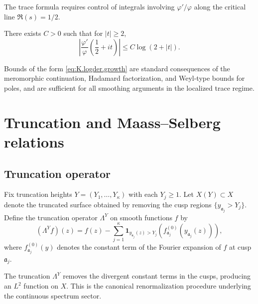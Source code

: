 The trace formula requires control of integrals involving $\varphi'/\varphi$ along the critical line $\Re(s)=1/2$.

\begin{assumption}
\label{ass:K.scattering.growth}
There exists $C>0$ such that for $|t|\ge 2$,
\begin{equation}\label{eq:K.logder.growth}
\left|\frac{\varphi'}{\varphi}\!\left(\frac12+it\right)\right|
\le
C\log(2+|t|).
\end{equation}
\end{assumption}

\begin{remark}
\label{rem:K.scattering.growth}
Bounds of the form \eqref{eq:K.logder.growth} are standard consequences of the meromorphic continuation,
Hadamard factorization, and Weyl-type bounds for poles, and are sufficient for all smoothing arguments in the
localized trace regime.
\end{remark}

\section{Truncation and Maass--Selberg relations}
\label{sec:K.ms}

\subsection{Truncation operator}
\label{subsec:K.truncation}

Fix truncation heights $Y=(Y_1,\dots,Y_\kappa)$ with each $Y_j\ge 1$.
Let $X(Y)\subset X$ denote the truncated surface obtained by removing the cusp regions
$\{y_{\mathfrak{a}_j}>Y_j\}$.
Define the truncation operator $\Lambda^Y$ on smooth functions $f$ by
\begin{equation}\label{eq:K.truncation.op}
(\Lambda^Y f)(z)
=
f(z)
-
\sum_{j=1}^\kappa
\mathbf{1}_{y_{\mathfrak{a}_j}(z)>Y_j}
\left(
f_{\mathfrak{a}_j}^{(0)}(y_{\mathfrak{a}_j}(z))
\right),
\end{equation}
where $f_{\mathfrak{a}_j}^{(0)}(y)$ denotes the constant term of the Fourier expansion of $f$ at cusp $\mathfrak{a}_j$.

\begin{remark}
\label{rem:K.truncation}
The truncation $\Lambda^Y$ removes the divergent constant terms in the cusps, producing an $L^2$ function on $X$.
This is the canonical renormalization procedure underlying the continuous spectrum sector.
\end{remark}

